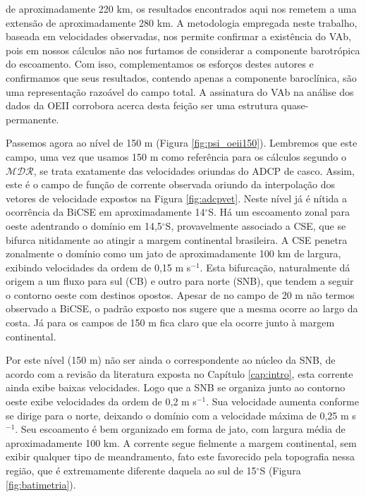 \hspace{-7mm} de aproximadamente 220 km, os resultados encontrados aqui nos remetem a uma extensão de aproximadamente 280 km. 
A metodologia empregada neste trabalho, baseada em velocidades observadas, nos permite
confirmar a existência do VAb, pois em nossos cálculos não nos furtamos de considerar
a componente barotrópica do escoamento. Com isso, complementamos os esforços destes autores e 
confirmamos que seus resultados, contendo apenas a componente baroclínica, são uma representação 
razoável do campo total. A assinatura do VAb na análise dos dados da OEII corrobora
\cite{silveira_etal2006B} acerca desta feição ser uma estrutura quase-permanente.

Passemos agora ao nível de 150 m (Figura \ref{fig:psi_oeii150}).
Lembremos que este campo, uma vez que usamos 150 m como referência 
para os cálculos segundo o $\mathcal{MDR}$, se trata exatamente das velocidades oriundas do ADCP de casco.
Assim, este é o campo de função de corrente observada oriundo da interpolação dos vetores de velocidade 
expostos na Figura \ref{fig:adcpvet}. 
Neste nível já é nítida a ocorrência da BiCSE em aproximadamente 14$^\circ$S. Há um
escoamento zonal para oeste adentrando o domínio em 14,5$^\circ$S, provavelmente associado a CSE, que 
se bifurca nitidamente ao atingir a margem continental brasileira. A CSE penetra zonalmente o domínio como um jato
de aproximadamente 100 km de largura, exibindo velocidades da ordem de 0,15 m s$^{-1}$. Esta bifurcação, naturalmente
dá origem a um fluxo para sul (CB) e outro para norte (SNB), que tendem a seguir o contorno oeste
com destinos opostos. Apesar de no campo de 20 m não termos observado a BiCSE, o padrão
exposto nos sugere que a mesma ocorre 
ao largo da costa. Já para os campos de 150 m fica claro que
ela ocorre junto à margem continental. 

Por este nível (150 m) não ser ainda o correspondente ao 
núcleo da SNB, de acordo com a revisão da literatura exposta no Capítulo \ref{cap:intro}, 
esta corrente ainda exibe baixas velocidades. Logo que a SNB se organiza junto ao contorno oeste
exibe velocidades da ordem de 0,2 m s$^{-1}$. Sua velocidade aumenta conforme se dirige para o 
norte, deixando o domínio com a velocidade máxima de 0,25 m s$^{-1}$. Seu escoamento é bem 
organizado em forma de jato, com largura média de aproximadamente 100 km. A corrente segue
fielmente a margem continental, sem exibir qualquer tipo de meandramento, fato este favorecido
pela topografia nessa região, que é extremamente diferente daquela ao sul de 15$^\circ$S (Figura \ref{fig:batimetria}).

